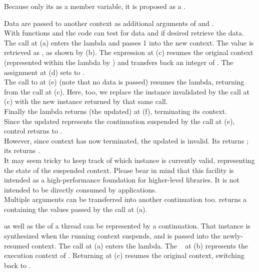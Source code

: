 \label{design}

Because \cont {} only its
 as a member variable, it is proposed as a
.


\label{subsec:data}

Data are passed to another context as additional arguments of \callcc and
\resume.\\
With functions \dataavail and \getdata the code can test for data and if desired
retrieve the data.
The  call at (a) enters the lambda and passes 1 into the
new context. The value is retrieved as , as shown by (b). The expression
 at (c) resumes the original context (represented
within the lambda by ) and transfers back an integer of .
The assignment at (d) sets  to .\\
The call to  at (e) (note that no data is passed) resumes the
lambda, returning from the  call at (c). Here, too,
we replace the \cont instance  invalidated by the \resume call at (c)
with the new instance returned by that same \resume call.\\
Finally the lambda returns (the updated)  at (f), terminating its
context.\\
Since the updated  represents the continuation suspended by the call at
(e), control returns to \main.\\
However, since context  has now terminated, the updated  is
invalid. Its \opbool returns ; its  returns
.\\
It may seem tricky to keep track of which \cont instance is currently valid,
representing the state of the suspended context. Please bear in mind that this
facility is intended as a high-performance foundation for higher-level
libraries. It is not intended to be directly consumed by applications.\\
Multiple arguments can be transferred into another continuation too.
 returns a 
containing the values passed by the \callcc call at (a).


\label{subsec:main}

\main as well as the \entryfn of a thread can be represented by a continuation.
That \cont instance is synthesized when the running context suspends, and is
passed into the newly-resumed context.
The  call at (a) enters the lambda. The \cont\  at (b)
represents the execution context of \main. Returning  at (c) resumes the
original context, switching back to \main.



